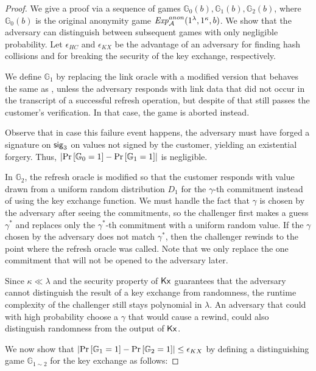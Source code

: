 \begin{proof}
  We give a proof via a sequence of games $\mathbb{G}_0(b), \mathbb{G}_1(b),
  \mathbb{G}_2(b)$, where $\mathbb{G}_0(b)$ is the original anonymity game
  $\mathit{Exp}_{\cal A}^{anon}(1^\lambda, 1^\kappa, b)$.  We show that the
  adversary can distinguish between subsequent games with only negligible
  probability.  Let $\epsilon_{HC}$ and $\epsilon_{KX}$ be the advantage of an
  adversary for finding hash collisions and for breaking the security of the
  key exchange, respectively.

  We define $\mathbb{G}_1$ by replacing the link oracle  with a
  modified version that behaves the same as , unless the adversary
  responds with link data that did not occur in the transcript of a successful
  refresh operation, but despite of that still passes the customer's
  verification.  In that case, the game is aborted instead.

  Observe that in case this failure event happens, the adversary must have forged a
  signature on $\mathsf{sig}_{3}$ on values not signed by the customer, yielding
  an existential forgery.  Thus, $\left| \Pr\left [\mathbb{G}_0 = 1 \right ] - \Pr\left [\mathbb{G}_1 = 1 \right ]
  \right|$ is negligible.

  In $\mathbb{G}_2$, the refresh oracle is modified so that the customer
  responds with value drawn from a uniform random distribution $D_1$ for the
  $\gamma$-th commitment instead of using the key exchange function.  We must
  handle the fact that $\gamma$ is chosen by the adversary after seeing the
  commitments, so the challenger first makes a guess $\gamma^*$ and replaces
  only the $\gamma^*$-th commitment with a uniform random value.  If the
  $\gamma$ chosen by the adversary does not match $\gamma^*$, then the
  challenger rewinds  to the point where the refresh oracle was called.
  Note that we only replace the one commitment that
  will not be opened to the adversary later.

  Since $\kappa \ll \lambda$ and the security property of $\mathsf{Kx}$
  guarantees that the adversary cannot distinguish the result of a key exchange
  from randomness, the runtime complexity of the challenger still stays
  polynomial in $\lambda$.  An adversary that could with high probability
  choose a $\gamma$ that would cause a rewind, could also distinguish
  randomness from the output of $\mathsf{Kx}$.


  We now show that $\left| \Pr\left [\mathbb{G}_1 = 1 \right ] - \Pr\left [\mathbb{G}_2 = 1 \right ]
  \right| \le \epsilon_{KX}$ by defining a distinguishing game $\mathbb{G}_{1
  \sim 2}$ for the key exchange as follows:


\end{proof}
